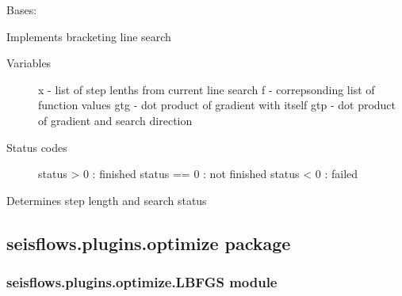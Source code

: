\documentclass[letterpaper,10pt,english]{sphinxmanual}
\begin{document}
\begin{fulllineitems}
\label{\detokenize{ref/seisflows.plugins.line_search:seisflows.plugins.line_search.bracket.Bracket}}
Bases: {\hyperref[\detokenize{ref/seisflows.plugins.line_search:seisflows.plugins.line_search.base.Base}]{}}

Implements bracketing line search
\begin{description}
\item[{Variables}] \leavevmode
x - list of step lenths from current line search
f - correpsonding list of function values
gtg - dot product of gradient with itself
gtp - dot product of gradient and search direction

\item[{Status codes}] \leavevmode
status \textgreater{} 0  : finished
status == 0 : not finished
status \textless{} 0  : failed

\end{description}

\begin{fulllineitems}
\label{\detokenize{ref/seisflows.plugins.line_search:seisflows.plugins.line_search.bracket.Bracket.calculate_step}}
Determines step length and search status

\end{fulllineitems}


\end{fulllineitems}



\subsection{seisflows.plugins.optimize package}
\label{\detokenize{ref/seisflows.plugins.optimize:seisflows-plugins-optimize-package}}\label{\detokenize{ref/seisflows.plugins.optimize::doc}}

\subsubsection{seisflows.plugins.optimize.LBFGS module}
\label{\detokenize{ref/seisflows.plugins.optimize:module-seisflows.plugins.optimize.LBFGS}}\label{\detokenize{ref/seisflows.plugins.optimize:seisflows-plugins-optimize-lbfgs-module}}
\end{document}
